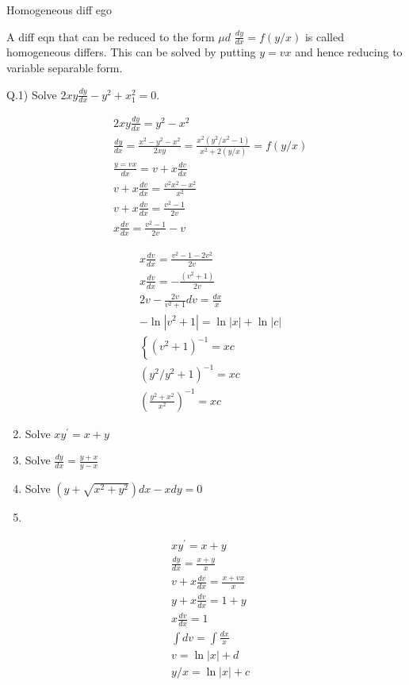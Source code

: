 \documentclass[10pt]{article}
\begin{document}
Homogeneous diff ego

A diff eqn that can be reduced to the form $\mu d$ $\frac{d y}{d x}=f(y / x)$ is called homogeneous differs. This can be solved by putting $y=v x$ and hence reducing to variable separable form.

Q.1) Solve $2 x y \frac{d y}{d x}-y^{2}+x_{1}^{2}=0$.

$$
\begin{aligned}
& 2 x y \frac{d y}{d x}= y^{2}-x^{2} \\
& \frac{d y}{d x}= \frac{x^{2}-y^{2}-x^{2}}{2 x y}=\frac{x^{2}\left(y^{2} / x^{2}-1\right)}{x^{2}+2(y / x)}=f(y / x) \\
& \frac{y=v x}{d x}=v+x \frac{d v}{d x} \\
& v+x \frac{d v}{d x}=\frac{v^{2} x^{2}-x^{2}}{x^{2}} \\
& v+x \frac{d v}{d x}=\frac{v^{2}-1}{2 v} \\
& x \frac{d v}{d x}=\frac{v^{2}-1}{2 v}-v
\end{aligned}
$$

$$
\begin{aligned}
& x \frac{d v}{d x}= \frac{v^{2}-1-2 v^{2}}{2 v} \\
& x \frac{d v}{d x}=-\frac{\left(v^{2}+1\right)}{2 v} \\
& 2 v-\frac{2 v}{v^{2}+1} d v=\frac{d x}{x} \\
&-\ln \left|v^{2}+1\right|=\ln |x|+\ln |c| \\
&\left\{\left(v^{2}+1\right)^{-1}=x c\right. \\
&\left(y^{2} / y^{2}+1\right)^{-1}=x c \\
&\left(\frac{y^{2}+x^{2}}{x^{2}}\right)^{-1}=x c
\end{aligned}
$$

\begin{enumerate}
  \setcounter{enumi}{1}
  \item Solve $x y^{\prime}=x+y$

  \item Solve $\frac{d y}{d x}=\frac{y+x}{y-x}$

  \item Solve $\left(y+\sqrt{x^{2}+y^{2}}\right) d x-x d y=0$

  \item 
\end{enumerate}

$$
\begin{aligned}
& x y^{\prime}=x+y \\
& \frac{d y}{d x}=\frac{x+y}{x} \\
& v+x \frac{d v}{d x}=\frac{x+v x}{x} \\
& y+x \frac{d v}{d x}=1+y \\
& x \frac{d v}{d x}=1 \\
& \int d v=\int \frac{d x}{x} \\
& v=\ln |x|+d \\
& y / x=\ln |x|+c
\end{aligned}
$$
\end{document}
